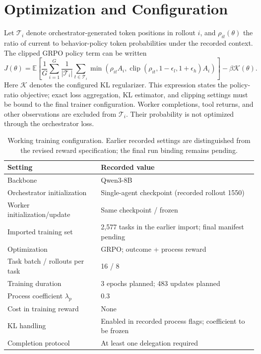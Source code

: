 \section{Optimization and Configuration}
\label{app:training}

Let $\mathcal T_i$ denote orchestrator-generated token positions in rollout $i$, and $\rho_{it}(\theta)$ the ratio of current to behavior-policy token probabilities under the recorded context. The clipped GRPO policy term can be written
\begin{equation}
 J(\theta)=\mathbb E\!\left[\frac1G\sum_{i=1}^{G}\frac1{|\mathcal T_i|}
 \sum_{t\in\mathcal T_i}\min\!\left(\rho_{it}A_i,
 \operatorname{clip}(\rho_{it},1-\epsilon_l,1+\epsilon_h)A_i\right)\right]
 -\beta\mathcal K(\theta).
 \tag{D.1}
\end{equation}
Here $\mathcal K$ denotes the configured KL regularizer. This expression states the policy-ratio objective; exact loss aggregation, KL estimator, and clipping settings must be bound to the final trainer configuration. Worker completions, tool returns, and other observations are excluded from $\mathcal T_i$. Their probability is not optimized through the orchestrator loss.

\begin{table}[ht]
\centering\small
\caption{Working training configuration. Earlier recorded settings are distinguished from the revised reward specification; the final run binding remains pending.}
\label{tab:configuration}
\begin{tabularx}{\linewidth}{YY}
\toprule
Setting & Recorded value \\
\midrule
Backbone & Qwen3-8B \\
Orchestrator initialization & Single-agent checkpoint (recorded rollout 1550) \\
Worker initialization/update & Same checkpoint / frozen \\
Imported training set & 2,577 tasks in the earlier import; final manifest pending \\
Optimization & GRPO; outcome + process reward \\
Task batch / rollouts per task & 16 / 8 \\
Training duration & 3 epochs planned; 483 updates planned \\
Process coefficient $\lambda_p$ & 0.3 \\
Cost in training reward & None \\
KL handling & Enabled in recorded process flags; coefficient to be frozen \\
Completion protocol & At least one delegation required \\
\bottomrule
\end{tabularx}
\end{table}

